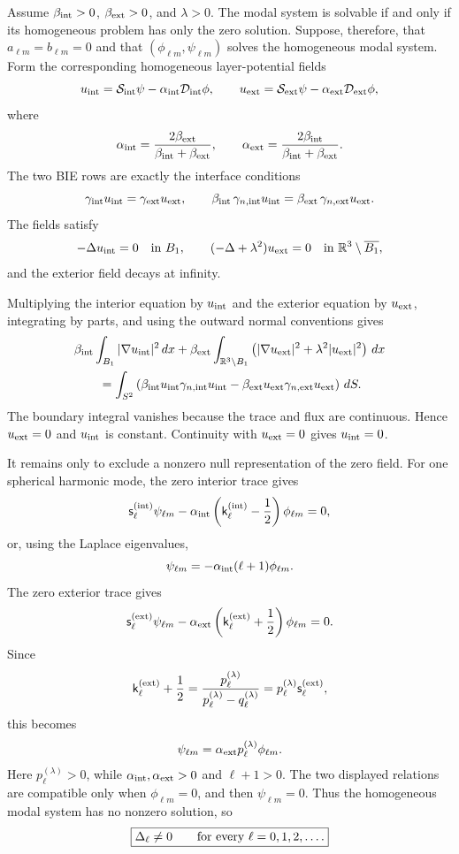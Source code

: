 \documentclass[11pt]{article}
\newcommand{\bi}{\beta_{\rm int}}
\newcommand{\be}{\beta_{\rm ext}}
\newcommand{\bsum}{\beta_{\rm int}+\beta_{\rm ext}}
\begin{document}
Assume $\bi>0$, $\be>0$, and $\lambda>0$.  The modal system is solvable if
and only if its homogeneous problem has only the zero solution.  Suppose,
therefore, that $a_{\ell m}=b_{\ell m}=0$ and that
$(\phi_{\ell m},\psi_{\ell m})$ solves the homogeneous modal system.  Form the
corresponding homogeneous layer-potential fields
\[
    u_{\rm int}
    =
    \mathcal{S}_{\rm int}\psi
    -
    \alpha_{\rm int}\mathcal{D}_{\rm int}\phi,
    \qquad
    u_{\rm ext}
    =
    \mathcal{S}_{\rm ext}\psi
    -
    \alpha_{\rm ext}\mathcal{D}_{\rm ext}\phi,
\]
where
\[
    \alpha_{\rm int}=\frac{2\be}{\bsum},
    \qquad
    \alpha_{\rm ext}=\frac{2\bi}{\bsum}.
\]
The two BIE rows are exactly the interface conditions
\[
    \gamma_{\rm int}u_{\rm int}
    =
    \gamma_{\rm ext}u_{\rm ext},
    \qquad
    \bi\,\gamma_{n,{\rm int}}u_{\rm int}
    =
    \be\,\gamma_{n,{\rm ext}}u_{\rm ext}.
\]
The fields satisfy
\[
    -\Delta u_{\rm int}=0
    \quad\hbox{in }B_1,
    \qquad
    (-\Delta+\lambda^2)u_{\rm ext}=0
    \quad\hbox{in }\mathbb{R}^3\setminus\overline{B_1},
\]
and the exterior field decays at infinity.

Multiplying the interior equation by $u_{\rm int}$ and the exterior equation
by $u_{\rm ext}$, integrating by parts, and using the outward normal
conventions gives
\begin{align*}
    &\bi\int_{B_1}|\nabla u_{\rm int}|^2\,dx
    +
    \be\int_{\mathbb{R}^3\setminus B_1}
    \left(|\nabla u_{\rm ext}|^2+\lambda^2|u_{\rm ext}|^2\right)\,dx \\
    &\qquad =
    \int_{S^2}
    \left(
    \bi u_{\rm int}\gamma_{n,{\rm int}}u_{\rm int}
    -
    \be u_{\rm ext}\gamma_{n,{\rm ext}}u_{\rm ext}
    \right)\,dS .
\end{align*}
The boundary integral vanishes because the trace and flux are continuous.
Hence $u_{\rm ext}=0$ and $u_{\rm int}$ is constant.  Continuity with
$u_{\rm ext}=0$ gives $u_{\rm int}=0$.

It remains only to exclude a nonzero null representation of the zero field.
For one spherical harmonic mode, the zero interior trace gives
\[
    \mathsf{s}_\ell^{({\rm int})}\psi_{\ell m}
    -
    \alpha_{\rm int}
    \left(\mathsf{k}_\ell^{({\rm int})}-\frac12\right)
    \phi_{\ell m}
    =
    0,
\]
or, using the Laplace eigenvalues,
\[
    \psi_{\ell m}
    =
    -\alpha_{\rm int}(\ell+1)\phi_{\ell m}.
\]
The zero exterior trace gives
\[
    \mathsf{s}_\ell^{({\rm ext})}\psi_{\ell m}
    -
    \alpha_{\rm ext}
    \left(\mathsf{k}_\ell^{({\rm ext})}+\frac12\right)
    \phi_{\ell m}
    =
    0.
\]
Since
\[
    \mathsf{k}_\ell^{({\rm ext})}+\frac12
    =
    \frac{p_\ell^{(\lambda)}}
         {p_\ell^{(\lambda)}-q_\ell^{(\lambda)}}
    =
    p_\ell^{(\lambda)}\mathsf{s}_\ell^{({\rm ext})},
\]
this becomes
\[
    \psi_{\ell m}
    =
    \alpha_{\rm ext}p_\ell^{(\lambda)}\phi_{\ell m}.
\]
Here $p_\ell^{(\lambda)}>0$, while
$\alpha_{\rm int},\alpha_{\rm ext}>0$ and $\ell+1>0$.  The two displayed
relations are compatible only when $\phi_{\ell m}=0$, and then
$\psi_{\ell m}=0$.  Thus the homogeneous modal system has no nonzero solution,
so
\[
    \boxed{\Delta_\ell\ne 0\qquad\hbox{for every }\ell=0,1,2,\dots .}
\]
\end{document}
